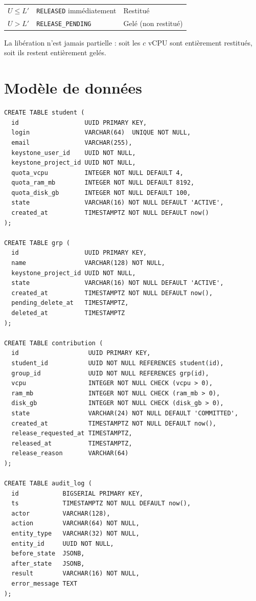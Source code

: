 \begin{xltabular}{\textwidth}{@{}lXX@{}}
\toprule
{} &  &  \\
\midrule
\endhead
\bottomrule
\endfoot
\bottomrule
\endlastfoot
$U \leq L'$ & \texttt{RELEASED} immédiatement & Restitué \\
$U > L'$    & \texttt{RELEASE\_PENDING} & Gelé (non restitué) \\

\end{xltabular}

La libération n'est jamais partielle : soit les $c$ vCPU sont entièrement restitués, soit ils restent entièrement gelés.

\section{Modèle de données}
\begin{lstlisting}[caption={Schéma PostgreSQL}]
CREATE TABLE student (
  id                  UUID PRIMARY KEY,
  login               VARCHAR(64)  UNIQUE NOT NULL,
  email               VARCHAR(255),
  keystone_user_id    UUID NOT NULL,
  keystone_project_id UUID NOT NULL,
  quota_vcpu          INTEGER NOT NULL DEFAULT 4,
  quota_ram_mb        INTEGER NOT NULL DEFAULT 8192,
  quota_disk_gb       INTEGER NOT NULL DEFAULT 100,
  state               VARCHAR(16) NOT NULL DEFAULT 'ACTIVE',
  created_at          TIMESTAMPTZ NOT NULL DEFAULT now()
);

CREATE TABLE grp (
  id                  UUID PRIMARY KEY,
  name                VARCHAR(128) NOT NULL,
  keystone_project_id UUID NOT NULL,
  state               VARCHAR(16) NOT NULL DEFAULT 'ACTIVE',
  created_at          TIMESTAMPTZ NOT NULL DEFAULT now(),
  pending_delete_at   TIMESTAMPTZ,
  deleted_at          TIMESTAMPTZ
);

CREATE TABLE contribution (
  id                   UUID PRIMARY KEY,
  student_id           UUID NOT NULL REFERENCES student(id),
  group_id             UUID NOT NULL REFERENCES grp(id),
  vcpu                 INTEGER NOT NULL CHECK (vcpu > 0),
  ram_mb               INTEGER NOT NULL CHECK (ram_mb > 0),
  disk_gb              INTEGER NOT NULL CHECK (disk_gb > 0),
  state                VARCHAR(24) NOT NULL DEFAULT 'COMMITTED',
  created_at           TIMESTAMPTZ NOT NULL DEFAULT now(),
  release_requested_at TIMESTAMPTZ,
  released_at          TIMESTAMPTZ,
  release_reason       VARCHAR(64)
);

CREATE TABLE audit_log (
  id            BIGSERIAL PRIMARY KEY,
  ts            TIMESTAMPTZ NOT NULL DEFAULT now(),
  actor         VARCHAR(128),
  action        VARCHAR(64) NOT NULL,
  entity_type   VARCHAR(32) NOT NULL,
  entity_id     UUID NOT NULL,
  before_state  JSONB,
  after_state   JSONB,
  result        VARCHAR(16) NOT NULL,
  error_message TEXT
);
\end{lstlisting}

